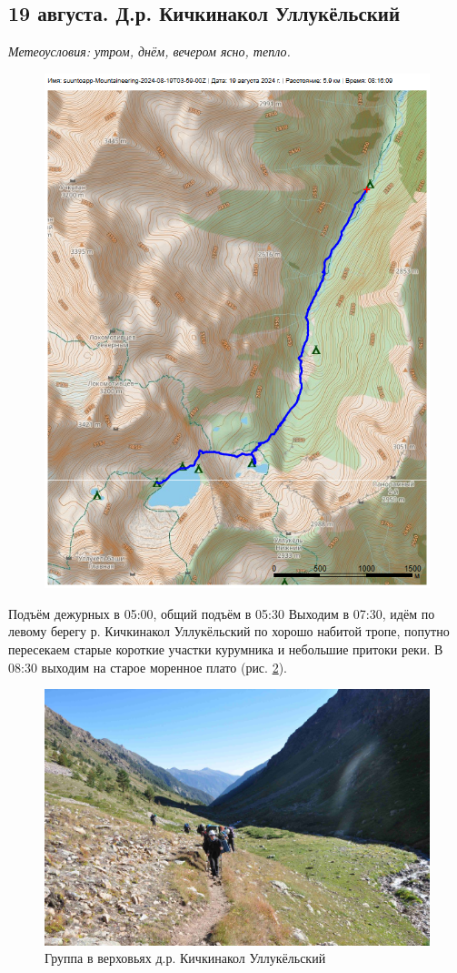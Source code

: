 \subsection{19 августа. Д.р. Кичкинакол Уллукёльский}
\textit{Метеоусловия: утром, днём, вечером ясно, тепло.}

\begin{figure}[h!]
	\centering
	\includegraphics[angle=0, width=0.7\linewidth]{../pics/mini_maps/19}
	\label{fig:mini_19}
\end{figure}

Подъём дежурных в 05:00, общий подъём в 05:30 
Выходим в 07:30, идём по левому берегу р. Кичкинакол Уллукёльский по хорошо набитой тропе, попутно  пересекаем старые короткие участки курумника и небольшие притоки реки. В 08:30 выходим на старое моренное плато (рис. \ref{fig:DSC_0692}).

\begin{figure}[h!]
	\centering
	\includegraphics[width=0.7\linewidth]{../pics/DSC_0692}
	\caption{Группа в верховьях д.р. Кичкинакол Уллукёльский}
	\label{fig:DSC_0692}
\end{figure}

